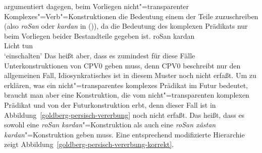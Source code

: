 \citet[--140]{Goldberg2003a} %
argumentiert dagegen, beim Vorliegen nicht"=transparenter Komplexes"=Verb"=Konstruktionen die Bedeutung
einem der Teile zuzuschreiben (also \emph{roSan} oder \emph{kardan} in ()),
da die Bedeutung des komplexen Prädikats nur beim Vorliegen beider Bestandteile gegeben ist. 
\ea
\gll roSan kardan\\
     Licht tun\\\nopagebreak
\glt `einschalten'
\z
Das heißt aber, dass es zumindest für diese Fälle Unterkonstruktionen von CPV0 geben muss,
denn CPV0 beschreibt nur den allgemeinen Fall, Idiosynkratisches ist in diesem Muster noch nicht erfaßt.
Um zu erklären, was ein nicht"=transparentes komplexes Prädikat im Futur bedeutet, braucht man aber
eine Konstruktion, die vom nicht"=transparenten komplexen Prädikat und von der Futurkonstruktion erbt,
denn dieser Fall ist in Abbildung~\ref{goldberg-persisch-vererbung} noch nicht erfaßt. Das heißt,
dass es sowohl eine \emph{roSan kardan}"=Konstruktion als auch eine \emph{roSan x{\^a}stan kardan}"=Konstruktion
geben muss. Eine entsprechend modifizierte Hierarchie zeigt Abbildung~\vref{goldberg-persisch-vererbung-korrekt}.
